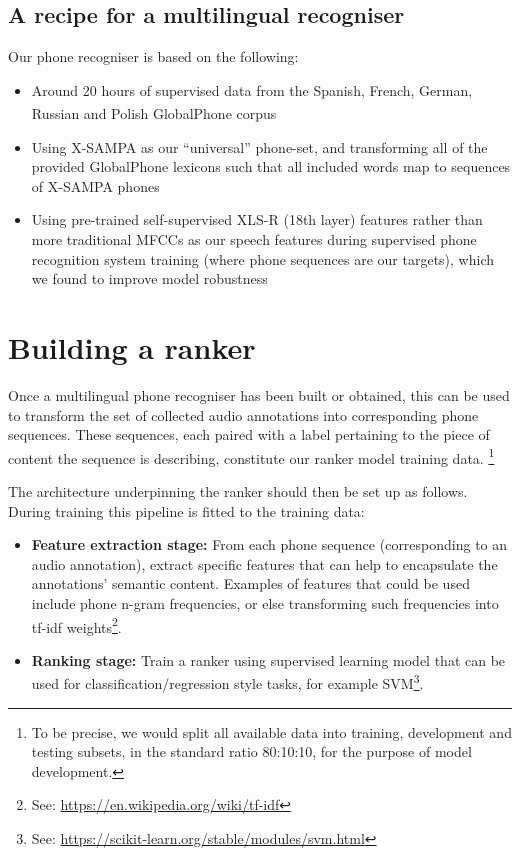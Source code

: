 \documentclass[10pt,twoside,openright]{report}
\begin{document}
\vspace{-1em}
\begin{unmutehighlight}
\section*{A recipe for a multilingual recogniser}
    Our phone recogniser is based on the following:
    \vspace{0.5em}
    \begin{itemize}[leftmargin=*]
        \item Around 20 hours of supervised data from the Spanish, French, German, Russian and Polish GlobalPhone\hyperref[foot:globalphone]{\color{white}\textsuperscript{}} corpus
        \item Using X-SAMPA as our ``universal'' phone-set, and transforming all of the provided GlobalPhone lexicons such that all included words map to sequences of X-SAMPA phones
        \item Using pre-trained self-supervised XLS-R (18th layer) features rather than more traditional MFCCs as our speech features during supervised phone recognition system training (where phone sequences are our targets), which we found to improve model robustness
    \end{itemize}
\end{unmutehighlight}

\vspace{-3em}


\section{Building a ranker}
Once a multilingual phone recogniser has been built or obtained, this can be used to transform the set of collected audio annotations into corresponding phone sequences.
These sequences, each paired with a label pertaining to the piece of content the sequence is describing, constitute our ranker model training data.
\footnote{To be precise, we would split all available data into training, development and testing subsets, in the standard ratio 80:10:10, for the purpose of model development.}

The architecture underpinning the ranker should then be set up as follows.
During training this pipeline is fitted to the training data:
\begin{itemize}
    \item \textbf{Feature extraction stage:} From each phone sequence (corresponding to an audio annotation), extract specific features that can help to encapsulate the annotations' semantic content. Examples of features that could be used include phone n-gram frequencies, or else transforming such frequencies into tf-idf weights\footnote{See: \url{https://en.wikipedia.org/wiki/tf-idf}}.
    \item \textbf{Ranking stage:} Train a ranker using supervised learning model that can be used for classification/regression style tasks, for example SVM\footnote{See: \url{https://scikit-learn.org/stable/modules/svm.html}}.
\end{itemize}
\end{document}
